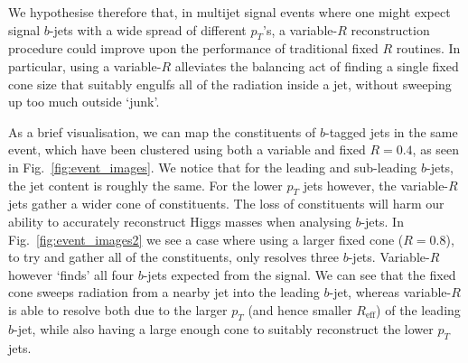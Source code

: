 \documentclass[12pt]{article}
\begin{document}
We hypothesise therefore that, in multijet signal events where one might expect signal $b$-jets with a wide spread of different $p_T$'s, a variable-$R$ reconstruction procedure could improve upon the performance of traditional fixed $R$ routines. In particular, using a variable-$R$ alleviates the balancing act of finding a single fixed cone size that suitably engulfs all of the radiation inside a jet, without sweeping up too much outside `junk'. 

As a brief visualisation, we can map the constituents of $b$-tagged
jets in the same event, which have been clustered using both a
variable and fixed $R=0.4$, as seen in Fig.~\ref{fig:event_images}. We notice that for the leading and sub-leading $b$-jets, the jet content is roughly the same. For the lower $p_T$ jets however, the variable-$R$ jets gather a wider cone of constituents. The loss of constituents will harm our ability to accurately reconstruct Higgs masses when analysing $b$-jets. In
Fig.~\ref{fig:event_images2} we see a case where using a larger fixed cone ($R=0.8$), to try and gather all of the constituents, only resolves three $b$-jets. Variable-$R$ however `finds'
all four $b$-jets expected from the signal. We can see that the fixed
cone sweeps radiation from a nearby jet into the leading $b$-jet,
whereas variable-$R$ is able to resolve both due to the larger $p_T$
(and hence smaller $R_{\text{eff}}$) of the leading $b$-jet, while
also having a large enough cone to suitably reconstruct the lower
$p_T$ jets.
\end{document}
